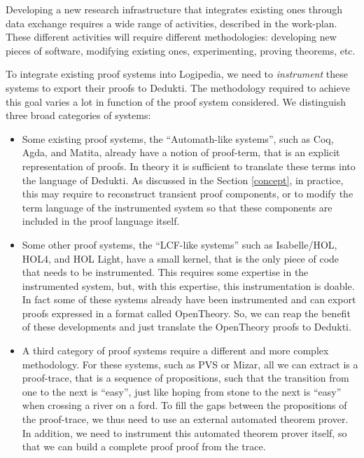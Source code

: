 Developing a new research infrastructure that integrates existing
ones through data exchange requires a wide range of activities,
described in the work-plan. These different activities will require
different methodologies: developing new pieces of software,
modifying existing ones, experimenting, proving theorems, etc.


To integrate existing proof systems into Logipedia, we need to
\emph{instrument} these systems to export their proofs to Dedukti. The
methodology required to achieve this goal varies a lot in function of
the proof system considered. We distinguish three broad categories of
systems:

\begin{itemize}

\item
Some existing proof systems, the ``Automath-like systems'', such as Coq, Agda, and
Matita, already have a notion of proof-term, that is an explicit
representation of proofs.  In theory it is sufficient to translate
these terms into the language of Dedukti.  As discussed in the Section
\ref{concept}, in practice, this may require to reconstruct transient
proof components, or to modify the term language of the instrumented
system so that these components are included in the proof language
itself.

\item
Some other proof systems, the ``LCF-like systems'' such as
Isabelle/HOL, HOL4, and HOL Light, have a small kernel, that is the
only piece of code that needs to be instrumented. This requires some
expertise in the instrumented system, but, with this expertise, this
instrumentation is doable. In fact some of these systems already have
been instrumented and can export proofs expressed in a format called
OpenTheory. So, we can reap the benefit of these developments and just
translate the OpenTheory proofs to Dedukti.

\item A third category of proof systems require a different and more
complex methodology. For these systems, such as PVS or Mizar, all we
can extract is a proof-trace, that is a sequence of propositions, such
that the transition from one to the next is ``easy'', just like hoping
from stone to the next is ``easy'' when crossing a river on a ford. To
fill the gaps between the propositions of the proof-trace, we thus
need to use an external automated theorem prover. In addition, we need
to instrument this automated theorem prover itself, so that we can
build a complete proof proof from the trace.
\end{itemize}

